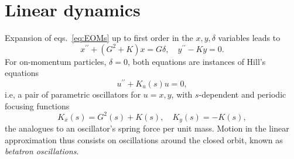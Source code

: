 \section{Linear dynamics}
Expansion of eqs.~\eqref{eq:EOMs} up to first order in the $x, y, \delta$ variables leads to \cite{sands_physics_1969}
    \begin{equation}
        x^{\prime\prime}+(G^2+K)x=G\delta, \quad
        y^{\prime\prime}-Ky=0.
        \label{eq:linearEOM}
    \end{equation}
    For on-momentum particles, $\delta=0$, both equations are instances of Hill's equations
    \begin{equation}
        u^{\prime\prime}+K_u(s)u = 0,
        \label{eq:Hill}
    \end{equation}
   i.e, a pair of parametric oscillators for $u=x,y$, with $s$-dependent and periodic focusing functions
         $$K_x(s) = G^2(s) + K(s), \quad K_y(s) = - K(s),$$
    the analogues to an oscillator's spring force per unit mass. Motion in the linear approximation thus consists on oscillations around the closed orbit, known as \textit{betatron oscillations}.
